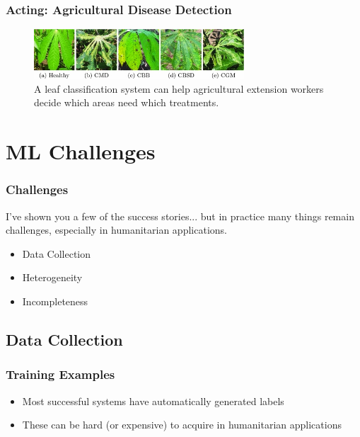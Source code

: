 \documentclass[10pt,mathserif]{beamer}
\begin{document}
\begin{frame}
  \frametitle{Acting: Agricultural Disease Detection}
  \begin{figure}[ht]
    \centering
    \includegraphics[width=0.7\textwidth]{figures/cassava}
    \caption{A leaf classification system can help agricultural extension
      workers decide which areas need which treatments. \label{fig:cassava} }
  \end{figure}

\end{frame}

\section{ML Challenges}
\label{sec:label}

\begin{frame}
  \frametitle{Challenges}

  I've shown you a few of the success stories... but in practice many things
  remain challenges, especially in humanitarian applications.

  \begin{itemize}
  \item Data Collection
  \item Heterogeneity
  \item Incompleteness
  \end{itemize} 
\end{frame}

\subsection{Data Collection}
\label{subsec:label}

\begin{frame}
  \frametitle{Training Examples}
  \begin{itemize}
  \item Most successful systems have automatically generated labels
  \item These can be hard (or expensive) to acquire in humanitarian applications
  \end{itemize} 
\end{frame}
\end{document}
